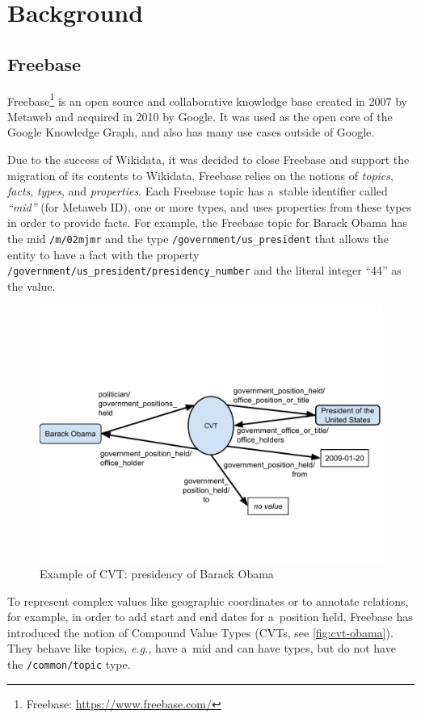 \documentclass{sig-alternate}
\begin{document}
\section{Background}\label{sec:background}

\subsection{Freebase}

Freebase\footnote{Freebase: \url{https://www.freebase.com/}} is an open source and
collaborative knowledge base created in 2007 by Metaweb and acquired in 2010 by Google.
It was used as the open core of the Google Knowledge Graph,
and also has many use cases outside of Google.

Due to the success of Wikidata,
it was decided to close Freebase and support the migration of its contents to Wikidata.
Freebase relies on the notions of \emph{topics}, \emph{facts}, \emph{types}, and \emph{properties}.
Each Freebase topic has a~stable identifier called \emph{``mid''} (for Metaweb ID),
one or more types, and uses properties from these types in order to provide facts.
For example, the Freebase topic for Barack Obama has the mid \texttt{/m/02mjmr}
and the type \texttt{/government/us\_president} that allows the entity to have
a fact with the property \texttt{/government/us\_president/presidency\_number}
and the literal integer ``44'' as the value.

\begin{figure}[!htbp]
\centering
\includegraphics[trim=0cm 3cm 0cm 5cm, width=8.45 cm]{img/freebase-cvt-obama.pdf}
\caption{Example of CVT: presidency of Barack Obama}
\label{fig:cvt-obama}
\end{figure}

To represent complex values like geographic coordinates or to annotate relations,
for example, in order to add start and end dates for a~position held,
Freebase has introduced the notion of Compound Value Types (CVTs, see \autoref{fig:cvt-obama}).
They behave like topics, \emph{e.g.}, have a~mid and can have types,
but do not have the \texttt{/common/topic} type.
\end{document}
